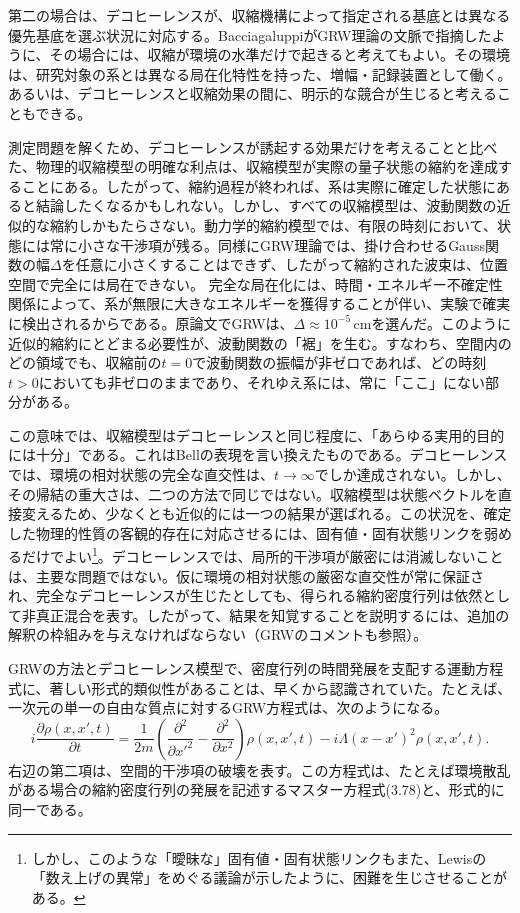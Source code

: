 第二の場合は、デコヒーレンスが、収縮機構によって指定される基底とは異なる優先基底を選ぶ状況に対応する。Bacciagaluppi\cite{ref391}がGRW理論の文脈で指摘したように、その場合には、収縮が環境の水準だけで起きると考えてもよい。その環境は、研究対象の系とは異なる局在化特性を持った、増幅・記録装置として働く。あるいは、デコヒーレンスと収縮効果の間に、明示的な競合が生じると考えることもできる。

測定問題を解くため、デコヒーレンスが誘起する効果だけを考えることと比べた、物理的収縮模型の明確な利点は、収縮模型が実際の量子状態の縮約を達成することにある。したがって、縮約過程が終われば、系は実際に確定した状態にあると結論したくなるかもしれない。しかし、すべての収縮模型は、波動関数の近似的な縮約しかもたらさない。動力学的縮約模型では、有限の時刻において、状態には常に小さな干渉項が残る。同様にGRW理論では、掛け合わせるGauss関数の幅$\Delta$を任意に小さくすることはできず、したがって縮約された波束は、位置空間で完全には局在できない。
\hypertarget{srcpage:352}{}\label{srcpage:352}
完全な局在化には、時間・エネルギー不確定性関係によって、系が無限に大きなエネルギーを獲得することが伴い、実験で確実に検出されるからである。原論文\cite{ref450}でGRWは、$\Delta\approx10^{-5}\,\mathrm{cm}$を選んだ。このように近似的縮約にとどまる必要性が、波動関数の「裾」\cite{ref468}を生む。すなわち、空間内のどの領域でも、収縮前の$t=0$で波動関数の振幅が非ゼロであれば、どの時刻$t>0$においても非ゼロのままであり、それゆえ系には、常に「ここ」にない部分がある。

この意味では、収縮模型はデコヒーレンスと同じ程度に、「あらゆる実用的目的には十分」である。これはBell\cite{ref469}の表現を言い換えたものである。デコヒーレンスでは、環境の相対状態の完全な直交性は、$t\to\infty$でしか達成されない。しかし、その帰結の重大さは、二つの方法で同じではない。収縮模型は状態ベクトルを直接変えるため、少なくとも近似的には一つの結果が選ばれる。この状況を、確定した物理的性質の客観的存在に対応させるには、固有値・固有状態リンクを弱めるだけでよい\footnote{しかし、このような「曖昧な」固有値・固有状態リンクもまた、Lewisの「数え上げの異常」をめぐる議論が示したように\cite{ref470}、困難を生じさせることがある。}。デコヒーレンスでは、局所的干渉項が厳密には消滅しないことは、主要な問題ではない。仮に環境の相対状態の厳密な直交性が常に保証され、完全なデコヒーレンスが生じたとしても、得られる縮約密度行列は依然として非真正混合を表す。したがって、結果を知覚することを説明するには、追加の解釈の枠組みを与えなければならない（GRWのコメント\cite{ref445}も参照）。

GRWの方法とデコヒーレンス模型で、密度行列の時間発展を支配する運動方程式に、著しい形式的類似性があることは、早くから認識されていた。たとえば、一次元の単一の自由な質点に対するGRW方程式は、次のようになる\cite{ref450}。
\begin{equation}
i\frac{\partial\rho(x,x',t)}{\partial t}
=\frac1{2m}\left(\frac{\partial^2}{\partial x'^2}-\frac{\partial^2}{\partial x^2}\right)\rho(x,x',t)
-i\Lambda(x-x')^2\rho(x,x',t).\tag{8.8}
\end{equation}
右辺の第二項は、空間的干渉項の破壊を表す。この方程式は、たとえば環境散乱がある場合の縮約密度行列の発展を記述するマスター方程式(3.78)と、形式的に同一である。

